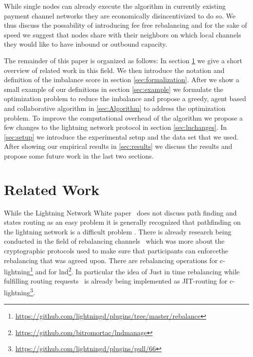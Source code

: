 \documentclass[a4paper]{paper}
\begin{document}
While single nodes can already execute the algorithm in currently existing payment channel networks they are economically disincentivized to do so.
We thus discuss the possability of introducing fee free rebalancing and for the sake of speed we suggest that nodes share with their neighbors on which local channels they would like to have inbound or outbound capacity. 

The remainder of this paper is organized as follows: In section \cref{sec:relatedWork} we give a short overview of related work in this field.
We then introduce the notation and definition of the imbalance score in section \cref{sec:formalization}.
After we show a small example of our definitions in section \cref{sec:example} we formulate the optimization problem to reduce the imbalance and propose a greedy, agent based and collaborative algorithm in \ref{sec:Algorithm} to address the optimization problem.
To improve the computational overhead of the algorithm we propose a few changes to the lightning network protocol in section \ref{sec:lnchanges}.
In \cref{sec:setup} we introduce the experimental setup and the data set that we used.
After showing our empirical results in \cref{sec:results} we discuss the results and propose some future work in the last two sections.



\section{Related Work}
\label{sec:relatedWork}

While the Lightning Network White paper~\cite{poon2016bitcoin} does not discuss path finding and states routing as an easy problem it is generally recognized that pathfinding on the lightning network is a difficult problem \cite{piatkivskyi2018split, prihodko2016flare, bagaria2019boomerang, pickhardt2019pathfinding, grunspan2018ant, sivaraman2018routing}.
There is already research being conducted in the field of rebalancing channels~\cite{khalil2017revive} which was more about the cryptographic protocols used to make sure that participants can enforcethe rebalancing that was agreed upon.
There are rebalancing operations for c-lightning\footnote{\url{https://github.com/lightningd/plugins/tree/master/rebalance}} and for lnd\footnote{\url{https://github.com/bitromortac/lndmanage}}.
In particular the idea of Just in time rebalancing while fulfilling routing requests~\cite{pickhardt2019jit} is already being implemented as JIT-routing for c-lightning\footnote{\url{https://github.com/lightningd/plugins/pull/66}}. 
\end{document}
